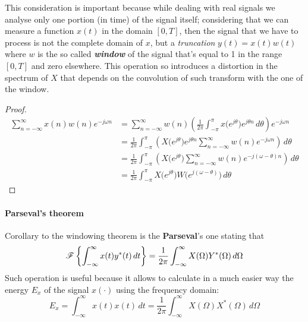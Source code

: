 		This consideration is important because while dealing with real signals we analyse only one portion (in time) of the signal itself; considering that we can measure a function $x(t)$ in the domain $[0,T]$, then the signal that we have to process is not the complete domain of $x$, but a \textit{truncation} $y(t) = x(t) w(t)$ where $w$ is the so called \textbf{\textit{window}} of the signal that's equal to 1 in the range $[0,T]$ and zero elsewhere. This operation so introduces a distortion in the spectrum of $X$ that depends on the convolution of such transform with the one of the window.
		
		\begin{proof}
			\begin{align*}
				\sum_{n=-\infty}^\infty x(n) w(n) e^{-j\omega n} & = \sum_{n=-\infty}^\infty w(n) \left( \frac 1 {2\pi} \int_{-\pi}^\pi x\big(e^{j\theta}\big) e^{j\theta n} \, d\theta \right) e^{-j\omega n} \\
				& = \frac 1 {2\pi} \int_{-\pi}^\pi \left( X\big(e^{j\theta}\big) e^{j\theta n} \sum_{n=-\infty}^\infty w(n) e^{-j\omega n} \right) \, d\theta \\
				& = \frac 1 {2\pi} \int_{-\pi}^\pi \left( X\big(e^{j\theta}\big)  \sum_{n=-\infty}^\infty w(n) e^{-j(\omega-\theta) n} \right) \, d\theta \\
				& = \frac 1 {2\pi} \int_{-\pi}^\pi X\big(e^{j\theta}\big) W \big(e^{j(\omega - \theta)}\big) \, d\theta
			\end{align*}
		\end{proof}
	
		\paragraph{Parseval's theorem} Corollary to the windowing theorem is the \textbf{Parseval}'s one stating that
		\begin{equation} \label{eq:four:parserval}
			\mathscr{F}\left\{ \int_{-\infty}^\infty x(t) y^* (t)\, dt \right\} = \frac 1 {2\pi} \int_{-\infty} ^\infty X(\Omega) Y^*(\Omega)\, d\Omega
		\end{equation}
		Such operation is useful because it allows to calculate in a much easier way the energy $E_x$ of the signal $x(\cdot)$ using the frequency domain:
		\[ E_x = \int_{-\infty}^{\infty} x(t)x(t)\, dt = \frac 1 {2\pi} \int_{-\infty}^\infty X(\Omega) X^*(\Omega) \,d\Omega \]
		
